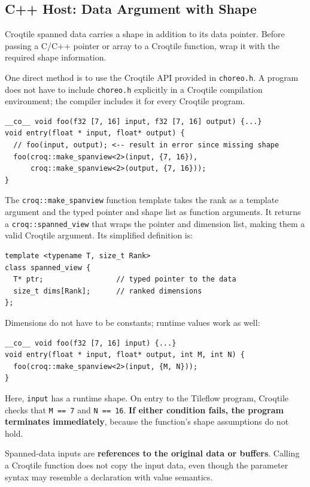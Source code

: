 \subsection*{C++ Host: Data Argument with Shape}

Croqtile spanned data carries a shape in addition to its data pointer. Before passing a C/C++ pointer or array to a Croqtile function, wrap it with the required shape information.

One direct method is to use the Croqtile API provided in \texttt{choreo.h}. A program does not have to include \texttt{choreo.h} explicitly in a Croqtile compilation environment; the compiler includes it for every Croqtile program.

\begin{lstlisting}[language=croqtile,caption={Passing a shaped buffer}]
__co__ void foo(f32 [7, 16] input, f32 [7, 16] output) {...}
void entry(float * input, float* output) {
  // foo(input, output); <-- result in error since missing shape
  foo(croq::make_spanview<2>(input, {7, 16}),
      croq::make_spanview<2>(output, {7, 16}));
}
\end{lstlisting}

The \texttt{croq:\allowbreak{}:\allowbreak{}make\_\allowbreak{}spanview} function template takes the rank as a template argument and the typed pointer and shape list as function arguments. It returns a \texttt{croq:\allowbreak{}:\allowbreak{}spanned\_\allowbreak{}view} that wraps the pointer and dimension list, making them a valid Croqtile argument. Its simplified definition is:

\begin{lstlisting}[language={},caption={The host-side buffer wrapper}]
template <typename T, size_t Rank>
class spanned_view {
  T* ptr;                 // typed pointer to the data
  size_t dims[Rank];      // ranked dimensions
};
\end{lstlisting}

Dimensions do not have to be constants; runtime values work as well:

\begin{lstlisting}[language=croqtile,caption={A call built from runtime dimensions}]
__co__ void foo(f32 [7, 16] input) {...}
void entry(float * input, float* output, int M, int N) {
  foo(croq::make_spanview<2>(input, {M, N}));
}
\end{lstlisting}

Here, \texttt{input} has a runtime shape. On entry to the Tileflow program, Croqtile checks that \texttt{M == 7} and \texttt{N == 16}. \textbf{If either condition fails, the program terminates immediately}, because the function's shape assumptions do not hold.

Spanned-data inputs are \textbf{references to the original data or buffers}. Calling a Croqtile function does not copy the input data, even though the parameter syntax may resemble a declaration with value semantics.
